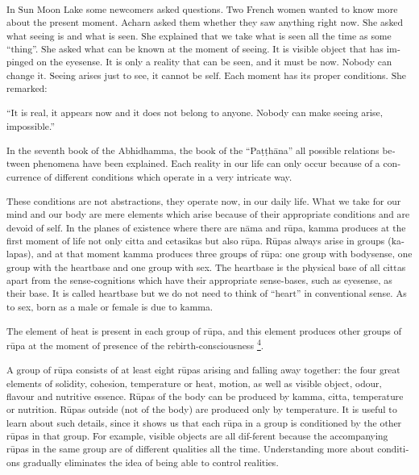 \textsuperscript{\textdutch{In Sun Moon Lake some newcomers asked
questions. Two French women wanted to know more about the present
moment. Acharn asked them whether they saw anything right now. She asked
what seeing is and what is seen. She explained that we take what is seen
all the time as some ``thing''. She asked what can be known at the
moment of seeing. It is visible object that has impinged on the
eyesense. It is only a reality that can be seen, and it must be now.
Nobody can change it. Seeing arises just to see, it cannot be self. Each
moment has its proper conditions. She remarked:}}

\textsuperscript{``\textdutch{It is real, it appears now and it does not
belong to anyone. Nobody can make seeing arise, impossible.''}}

\textsuperscript{\textdutch{In the seventh book of the Abhidhamma, the
book of the }``Pa\textdutch{ṭṭhā}na''\textdutch{
}\textenglish[variant=american]{all possible relations between
phenomena}\textdutch{ have been
explained}\textenglish[variant=american]{. Each reality in our life can
only occur because of a concurrence of different conditions which
operate in a very intricate way. }}

\textsuperscript{\textenglish[variant=american]{These conditions are not
abstractions, they operate now, in our daily life. What we take for our
mind and our body are mere elements which arise because of their
appropriate conditions and are devoid of self. }\textdutch{In the planes
of existence where there are nāma and rūpa, kamma produces at the first
moment of life not only citta and cetasikas but also rūpa. Rūpas always
arise in groups (kalapas), and at that moment kamma produces three
groups of rūpa: one group with bodysense, one group with the heartbase
and one group with sex. The heartbase is the physical base of all cittas
apart from the sense-cognitions which have their appropriate
sense-bases, such as eyesense, as their base. It is called heartbase but
we do not need to think of ``heart'' in conventional sense. As to sex,
born as a male or female is due to kamma. }}

\textsuperscript{\textdutch{The element of heat is present in each group
of rūpa, and this element produces other groups of rūpa at the moment of
presence of the rebirth-consciousness
\protect\hyperlink{sdfootnote4sym}{\textsuperscript{4}}. }}

\textsuperscript{\textdutch{A group of rūpa consists of at least eight
rūpas arising and falling away together: the four great elements of
solidity, cohesion, temperature or heat, motion, as well as visible
object, odour, flavour and nutritive essence. Rūpas of the body can be
produced by kamma, citta, temperature or nutrition. Rūpas outside (not
of the body) are produced only by temperature. It is useful to learn
about such details, since it shows us that each rūpa in a group is
conditioned by the other rūpas in that group. For example, visible
objects are all dif-ferent because the accompanying rūpas in the same
group are of different qualities all the time. Understanding more about
conditions gradually eliminates the idea of being able to control
realities. }}

